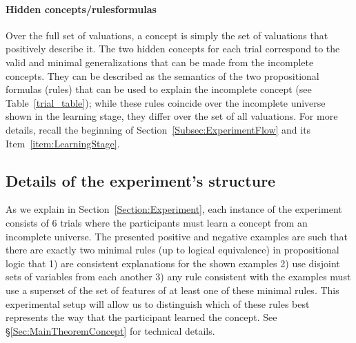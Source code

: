 \paragraph{Hidden concepts/rules\textemdash formulas}
Over the full set of valuations, a concept is simply the set of valuations that positively describe it. The two hidden concepts for each trial correspond to the valid and minimal generalizations that can be made from the incomplete concepts. They can be described as the semantics of the two propositional formulas (rules) that can be used to explain the incomplete concept (see Table~\ref{trial_table}); while these rules coincide over the incomplete universe shown in the learning stage, they differ over the set of all valuations. For more details, recall the beginning of Section~\ref{Subsec:ExperimentFlow} and its Item~\ref{item:LearningStage}. 



\subsection{Details of the experiment's structure} \label{FullExperimentDescription} 
As we explain in Section~\ref{Section:Experiment}, each instance of the experiment consists of 6 trials where the participants must learn a concept from an incomplete universe. The presented positive and negative examples are such that there are exactly two minimal rules (up to logical equivalence) in propositional logic that 1) are consistent explanations for the shown examples 2) use disjoint sets of variables from each another 3) any rule consistent with the examples must use a superset of the set of features of at least one of these minimal rules. 
This experimental setup will allow us to distinguish which of these rules best represents the way that the participant learned the concept. See \S\ref{Sec:MainTheoremConcept} for technical details.




